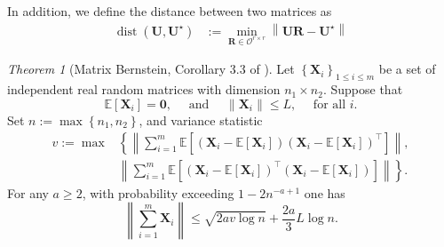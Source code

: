 \documentclass[12pt]{article}
\theoremstyle{remark}
\newtheorem{theorem}{Theorem}
\begin{document}
In addition, we define the distance between two matrices as 
\begin{equation}
\begin{aligned}
\operatorname{dist}\left(\boldsymbol{U}, \boldsymbol{U}^{\star}\right) &:=\min _{\boldsymbol{R} \in \mathcal{O}^{r \times r}}\left\|\boldsymbol{U} \boldsymbol{R}-\boldsymbol{U}^{\star}\right\| 
\end{aligned}
\end{equation}




\begin{theorem}[Matrix Bernstein, Corollary 3.3 of \cite{Chen:2021}]
\label{THM3}
Let $\left\{\boldsymbol{X}_i\right\}_{1 \leq i \leq m}$ be a set of independent real random matrices with dimension $n_1 \times n_2$. Suppose that
$$
\mathbb{E}\left[\boldsymbol{X}_i\right]=\mathbf{0}, \quad \text { and } \quad\left\|\boldsymbol{X}_i\right\| \leq L, \quad \text { for all } i .
$$
Set $n:=\max \left\{n_1, n_2\right\}$, and variance statistic \begin{equation}
\begin{aligned}
v:=\max &\left\{ \left\|\sum_{i=1}^m \mathbb{E}\left[\left(\boldsymbol{X}_i-\mathbb{E}\left[\boldsymbol{X}_i\right]\right)\left(\boldsymbol{X}_i-\mathbb{E}\left[\boldsymbol{X}_i\right]\right)^{\top}\right] \right\|,\right.\\
&\left.\left\|\sum_{i=1}^m \mathbb{E}\left[\left(\boldsymbol{X}_i-\mathbb{E}\left[\boldsymbol{X}_i\right]\right)^{\top}\left(\boldsymbol{X}_i-\mathbb{E}\left[\boldsymbol{X}_i\right]\right)\right]\right\|\right\}.
\end{aligned}
\end{equation}
For any $a \geq 2$, with probability exceeding $1-2 n^{-a+1}$ one has
$$
\left\|\sum_{i=1}^m \boldsymbol{X}_i\right\| \leq \sqrt{2 a v \log n}+\frac{2 a}{3} L \log n .
$$
\end{theorem}
\end{document}

